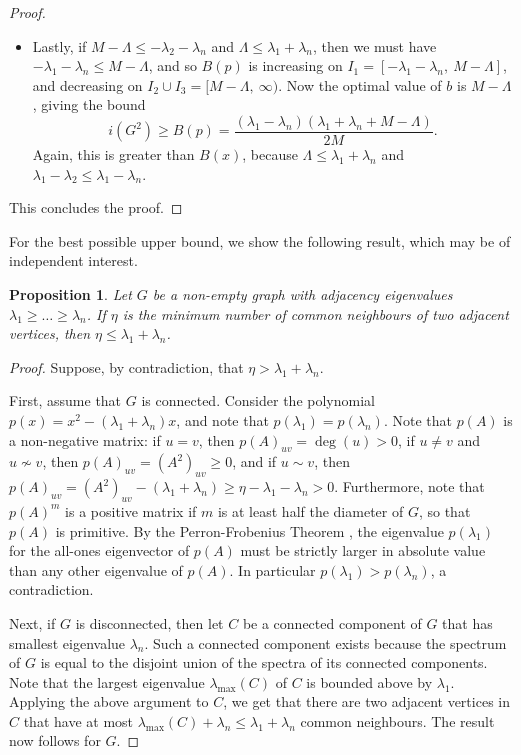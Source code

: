 \documentclass[a4paper,11pt]{article}
\newtheorem{proposition}[theorem]{Proposition}
\theoremstyle{definition}
\begin{document}
\begin{proof}
\begin{itemize}
\begin{itemize}
            $$i(G^2)\ge B(p) = \frac{(\lambda_1-\lambda_2)(\lambda_1-\lambda_n)}{2(\Lambda-\lambda_2-\lambda_n)},$$
            which is again greater than $B(x)$ because $\Lambda<\lambda_1+\lambda_2$.
            \item Lastly, if $M-\Lambda \le -\lambda_2-\lambda_n$ and $\Lambda \le \lambda_1+\lambda_n$, then we must have $-\lambda_1-\lambda_n \le M-\Lambda$, and so $B(p)$ is increasing on $I_1=[-\lambda_1-\lambda_n,\ M-\Lambda]$, and decreasing on $I_2\cup I_3=[M-\Lambda,\ \infty)$. Now the optimal value of $b$ is $M-\Lambda$, giving the bound
            $$i(G^2)\ge B(p)=\frac{(\lambda_1-\lambda_n)(\lambda_1+\lambda_n+M-\Lambda)}{2M}.$$
            Again, this is greater than $B(x)$, because $\Lambda\le \lambda_1+\lambda_n$ and $\lambda_1-\lambda_2 \le \lambda_1-\lambda_n$.
    \end{itemize}
    \end{itemize}
    This concludes the proof.
\end{proof}


For the best possible upper bound, we show the following result, which may be of independent interest.
 
\begin{proposition}\label{proposition:nu<=}
    Let $G$ be a non-empty graph with adjacency eigenvalues $\lambda_1\ge \dots \ge \lambda_n$. If $\eta$ is the minimum number of common neighbours of two adjacent vertices, then $\eta \le \lambda_1+\lambda_n$.
\end{proposition}

\begin{proof}
    Suppose, by contradiction, that $\eta > \lambda_1+\lambda_n$.

    First, assume that $G$ is connected. Consider the polynomial $p(x)=x^2-(\lambda_1+\lambda_n)x$, and note that $p(\lambda_1)=p(\lambda_n)$. Note that $p(A)$ is a non-negative matrix: if $u=v$, then $p(A)_{uv}=\deg(u)>0$, if $u\ne v$ and $u\not \sim v$, then $p(A)_{uv}=(A^2)_{uv}\ge 0$, and if $u\sim v$, then $p(A)_{uv}=(A^2)_{uv}-(\lambda_1+\lambda_n)\ge \eta -\lambda_1-\lambda_n >0$. Furthermore, note that $p(A)^m$ is a positive matrix if $m$ is at least half the diameter of $G$, so that $p(A)$ is primitive. By the Perron-Frobenius Theorem \cite{spectra}, the eigenvalue $p(\lambda_1)$ for the all-ones eigenvector of $p(A)$ must be strictly larger in absolute value than any other eigenvalue of $p(A)$. In particular $p(\lambda_1)>p(\lambda_n)$, a contradiction.

    Next, if $G$ is disconnected, then let $C$ be a connected component of $G$ that has smallest eigenvalue $\lambda_n$. Such a connected component exists because the spectrum of $G$ is equal to the disjoint union of the spectra of its connected components. Note that the largest eigenvalue $\lambda_{\max}(C)$ of $C$ is bounded above by $\lambda_1$. Applying the above argument to $C$, we get that there are two adjacent vertices in $C$ that have at most $\lambda_{\max}(C)+\lambda_n\le \lambda_1+\lambda_n$ common neighbours. The result now follows for $G$.
\end{proof}
\end{document}
